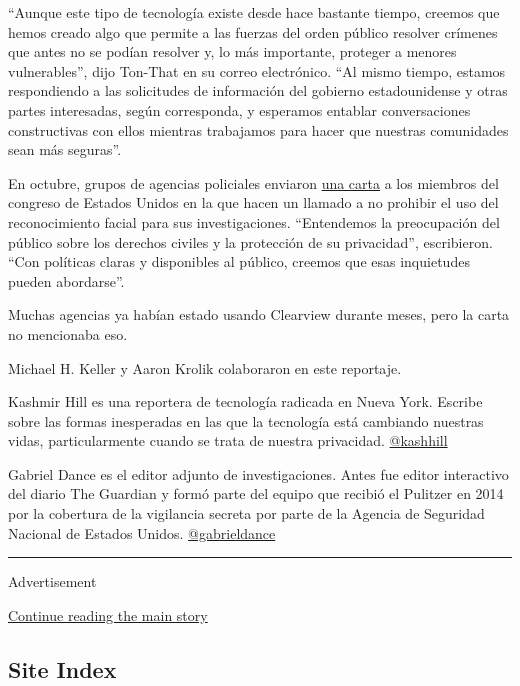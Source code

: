 ``Aunque este tipo de tecnología existe desde hace bastante tiempo,
creemos que hemos creado algo que permite a las fuerzas del orden
público resolver crímenes que antes no se podían resolver y, lo más
importante, proteger a menores vulnerables'', dijo Ton-That en su correo
electrónico. ``Al mismo tiempo, estamos respondiendo a las solicitudes
de información del gobierno estadounidense y otras partes interesadas,
según corresponda, y esperamos entablar conversaciones constructivas con
ellos mientras trabajamos para hacer que nuestras comunidades sean más
seguras''.

En octubre, grupos de agencias policiales enviaron
\href{https://www.ascia.org/pdf/news/le_group_letter_to_congress__facial_recogniton_technology__october_2019.pdf}{una
carta} a los miembros del congreso de Estados Unidos en la que hacen un
llamado a no prohibir el uso del reconocimiento facial para sus
investigaciones. ``Entendemos la preocupación del público sobre los
derechos civiles y la protección de su privacidad'', escribieron. ``Con
políticas claras y disponibles al público, creemos que esas inquietudes
pueden abordarse''.

Muchas agencias ya habían estado usando Clearview durante meses, pero la
carta no mencionaba eso.

Michael H. Keller y Aaron Krolik colaboraron en este reportaje.

Kashmir Hill es una reportera de tecnología radicada en Nueva York.
Escribe sobre las formas inesperadas en las que la tecnología está
cambiando nuestras vidas, particularmente cuando se trata de nuestra
privacidad. \href{https://twitter.com/kashhill}{@kashhill}

Gabriel Dance es el editor adjunto de investigaciones. Antes fue editor
interactivo del diario The Guardian y formó parte del equipo que recibió
el Pulitzer en 2014 por la cobertura de la vigilancia secreta por parte
de la Agencia de Seguridad Nacional de Estados Unidos.
\href{https://twitter.com/gabrieldance}{@gabrieldance}

\begin{center}\rule{0.5\linewidth}{\linethickness}\end{center}

Advertisement

\protect\hyperlink{after-bottom}{Continue reading the main story}

\hypertarget{site-index}{%
\subsection{Site Index}\label{site-index}}

